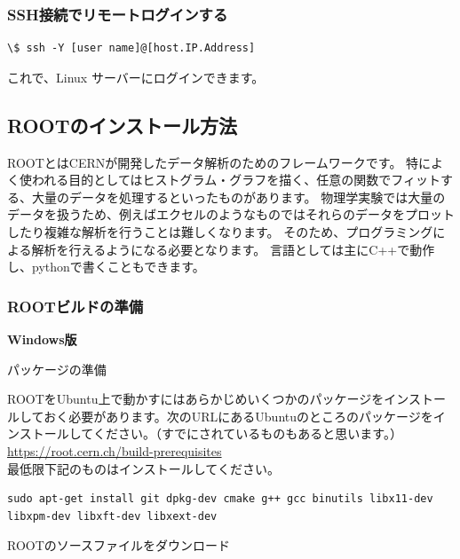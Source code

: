 \documentclass[uplatex,10pt,a4j]{jsarticle}
\begin{document}
\subsubsection{SSH接続でリモートログインする}
\begin{lstlisting}
\$ ssh -Y [user name]@[host.IP.Address]
\end{lstlisting}
これで、Linux サーバーにログインできます。

\subsection{ROOTのインストール方法}

ROOTとはCERNが開発したデータ解析のためのフレームワークです。
特によく使われる目的としてはヒストグラム・グラフを描く、任意の関数でフィットする、大量のデータを処理するといったものがあります。
物理学実験では大量のデータを扱うため、例えばエクセルのようなものではそれらのデータをプロットしたり複雑な解析を行うことは難しくなります。
そのため、プログラミングによる解析を行えるようになる必要となります。
言語としては主にC++で動作し、pythonで書くこともできます。

\subsubsection{ROOTビルドの準備}

\vspace{1cm}
{\large \bf Windows版}
\vspace{0.5cm}

\vspace{0.5cm}
パッケージの準備
\vspace{0.3cm}

ROOTをUbuntu上で動かすにはあらかじめいくつかのパッケージをインストールしておく必要があります。次のURLにあるUbuntuのところのパッケージをインストールしてください。（すでにされているものもあると思います。）\\
\url{https://root.cern.ch/build-prerequisites}\\
最低限下記のものはインストールしてください。
\begin{lstlisting}
sudo apt-get install git dpkg-dev cmake g++ gcc binutils libx11-dev libxpm-dev libxft-dev libxext-dev
\end{lstlisting}

\vspace{0.3cm}
ROOTのソースファイルをダウンロード
\vspace{0.3cm}
\end{document}
